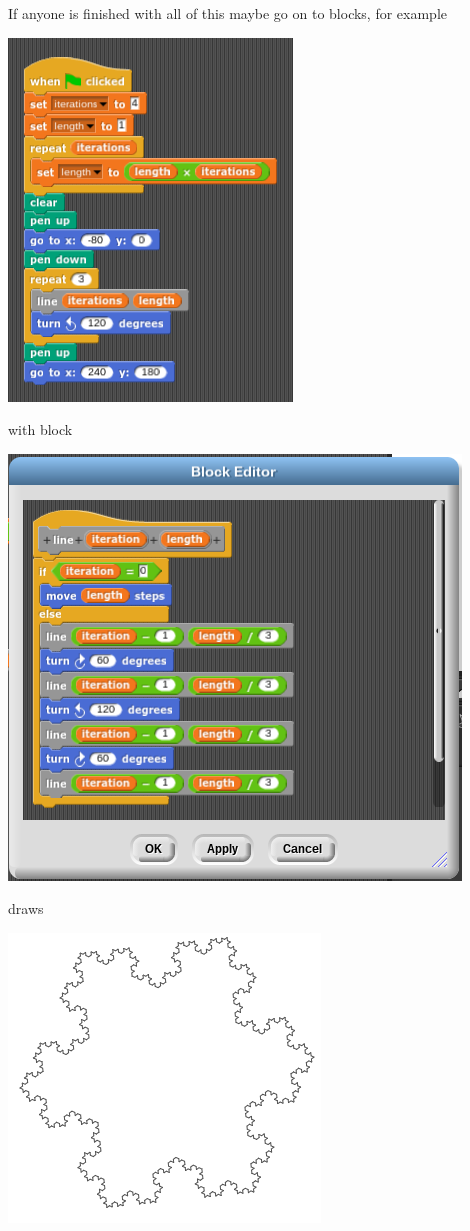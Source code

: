 \documentclass[11pt,a4paper]{scrartcl}
\begin{document}
If anyone is finished with all of this maybe go on to blocks, for example
\begin{center}
\includegraphics{koch.png}
\end{center}
with block
\begin{center}
\includegraphics{koch_block.png}
\end{center}
draws
\begin{center}
\includegraphics{koch_pic.png}
\end{center}
\end{document}
